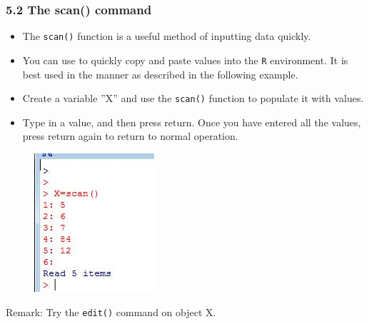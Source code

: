 \documentclass{beamer}
\begin{document}
 	\begin{frame}
 		\frametitle{5.2 The scan() command}
 		\begin{itemize}
 			\item The \texttt{scan()} function is a useful method of inputting data quickly. 
 			\item You can use to quickly copy
 			and paste values into the \texttt{R} environment. It is best used in the manner as described in the
 			following example. 
 			\item Create a variable ”X” and use the \texttt{scan()} function to populate it with
 			values. 
 			\item Type in a value, and then press return. Once you have entered all the values, press
 			return again to return to normal operation.
 		\end{itemize}
 	\end{frame}
 	\begin{frame}
 		\begin{figure}
 			\centering
 			\includegraphics[width=1.2\linewidth]{images/scannumbers}
 		\end{figure}
 		
 		Remark: Try the \texttt{edit()} command on object X.
 	\end{frame}
\end{document}
